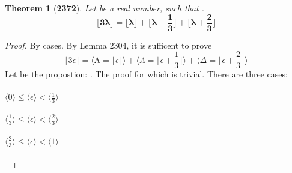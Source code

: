 \documentclass[preview]{standalone}
\newtheorem*{theorem*}{Theorem}
\begin{document}
\begin{theorem*}[\textbf{2372}]
    Let \bm{$\lambda$} be a real number, such that
    \bm{$\big \lfloor \lambda \big \rfloor + \epsilon = \lambda$}.
    \begin{equation*}
        \bm{
            \bigg \lfloor 3 \lambda \bigg \rfloor
                = 
            \bigg \lfloor \lambda \bigg \rfloor
                + 
            \bigg \lfloor \lambda + \frac{1}{3} \bigg \rfloor
                + 
            \bigg \lfloor \lambda + \frac{2}{3} \bigg \rfloor
        }
    \end{equation*}
\end{theorem*}

\begin{proof}
    By cases. By Lemma 2304, it is sufficent to prove
    \begin{equation*}
        \bigg \lfloor 3 \epsilon \bigg \rfloor
            =
        \Bigg \langle 
            \mathrm{A} 
                = 
            \bigg \lfloor \epsilon \bigg \rfloor 
        \Bigg \rangle
            +
        \Bigg \langle
            \Lambda
                = 
            \bigg \lfloor \epsilon + \frac{1}{3} \bigg \rfloor 
        \Bigg \rangle
            +
        \Bigg \langle
            \Delta
                = 
            \bigg \lfloor \epsilon + \frac{2}{3} \bigg \rfloor
        \Bigg \rangle
    \end{equation*}
    Let  be the propostion: .
    The proof for which is trivial.
    There are three cases:
    \\ \\
    \indent \indent {} \space \space
    $
        \Big \langle 0 \Big \rangle 
            \le 
        \Big \langle \epsilon \Big \rangle
            < 
        \Big \langle \frac{1}{3} \Big \rangle
    $
    \\ \\
    \indent \indent {} \space
    $
        \Big \langle \frac{1}{3} \Big \rangle 
            \le 
        \Big \langle \epsilon \Big \rangle
            < 
        \Big \langle \frac{2}{3} \Big \rangle
    $ 
    \\ \\
    \indent \indent {}
    $ 
        \Big \langle \frac{2}{3} \Big \rangle 
            \le 
        \Big \langle \epsilon \Big \rangle 
            < 
        \Big \langle 1 \Big \rangle
    $
    \\ \\

\end{proof}
\end{document}
